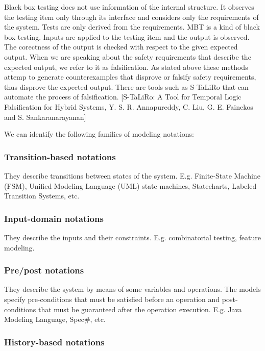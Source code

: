 Black box testing does not use information of the internal structure. It observes the testing item only through its interface and considers only the requirements of the system. Tests are only derived from the requirements. MBT is a kind of black box testing. Inputs are applied to the testing item and the output is observed. The corectness of the output is checked with respect to the given expected output. When we are speaking about the safety requirements that describe the expected output, we refer to it as falsification. As stated above these methods attemp to generate counterexamples that disprove or falsify safety requirements, thus disprove the expected output. There are tools such as S-TaLiRo that can automate the process of falsification. [S-TaLiRo: A Tool for Temporal Logic Falsification for Hybrid Systems, Y. S. R. Annapureddy, C. Liu, G. E. Fainekos and S. Sankaranarayanan]

We can identify the following families of modeling notations:

\subsubsection{Transition-based notations}

They describe transitions between states of the system. E.g. Finite-State Machine (FSM), Unified Modeling Language (UML) state machines, Statecharts, Labeled Transition Systems, etc.

\subsubsection{Input-domain notations}

They describe the inputs and their constraints. E.g. combinatorial testing, feature modeling.

\subsubsection{Pre/post notations}

They describe the system by means of some variables and operations. The models specify pre-conditions that must be satisfied before an operation and post-conditions that must be guaranteed after the operation execution. E.g. Java Modeling Language, Spec\#, etc.

\subsubsection{History-based notations}

